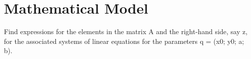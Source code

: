 \section{Mathematical Model}
Find expressions for the elements in the matrix A and the right-hand
side, say z, for the associated systems of linear equations for the parameters q = (x0; y0; a; b).